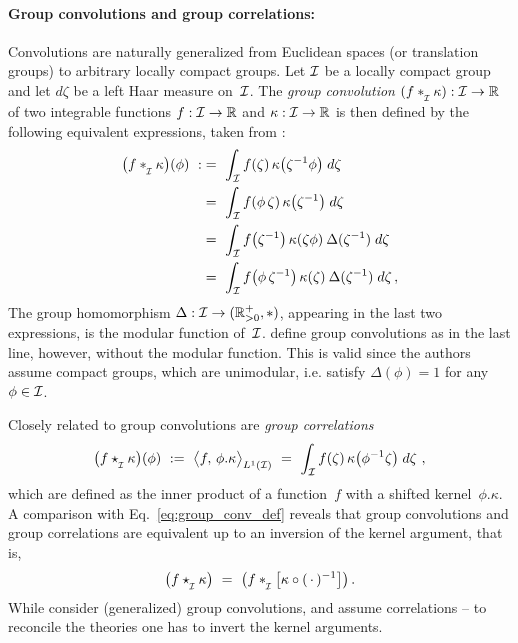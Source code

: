 \paragraph{Group convolutions and group correlations:}
Convolutions are naturally generalized from Euclidean spaces (or translation groups) to arbitrary locally compact groups.
Let $\mathcal{I}$ be a locally compact group and let $d\zeta$ be a left Haar measure on~$\mathcal{I}$.
The \emph{group convolution} $(f \ast_{\overset{}{\protect\scalebox{.64}{$\mkern-.5mu \I$}}} \kappa): \I \to \R$ of two integrable functions $f:\mathcal{I}\to\mathbb{R}$ and $\kappa:\mathcal{I}\to\mathbb{R}$ is then defined by the following equivalent expressions, taken from \cite{gallier2019harmonicRepr}:
\begin{align}\label{eq:group_conv_def}
    \big(f \ast_{\overset{}{\protect\scalebox{.64}{$\mkern-.5mu \I$}}} \kappa \big)(\phi)
    \ :&=\ \int_{\I} f(\zeta)\, \kappa\big( \zeta^{-1} \phi \big) \; d\zeta \notag \\
    \ &=\ \int_{\I} f(\phi\, \zeta)\, \kappa\big( \zeta^{-1}\big) \; d\zeta \notag \\
    \ &=\ \int_{\I} f\big(\zeta^{-1} \big)\, \kappa( \zeta\phi)\: \Delta(\zeta^{-1}) \; d\zeta \notag \\
    \ &=\ \int_{\I} f\big(\phi\, \zeta^{-1} \big)\, \kappa( \zeta)\: \Delta(\zeta^{-1}) \; d\zeta \,,
\end{align}
The group homomorphism $\Delta: \mathcal{I} \to (\mathbb{R}^+_{>0},*)$, appearing in the last two expressions, is the modular function of~$\mathcal{I}$.
\citet{Kondor2018-GENERAL} define group convolutions as in the last line, however, without the modular function.
This is valid since the authors assume compact groups, which are unimodular, i.e. satisfy $\Delta(\phi) = 1$ for any $\phi \in\mathcal{I}$.


Closely related to group convolutions are \emph{group correlations}
\begin{align}\label{eq:group_corr_def}
    \big(f \star_{\overset{}{\protect\scalebox{.64}{$\mkern-.5mu \I$}}} \kappa \big)(\phi)
    \ :=\ \big\langle f,\, \phi.\kappa \big\rangle_{L^1(\I)}
    \ =\ \int_{\I} f(\zeta)\, \kappa\big( \phi^{-1} \zeta \big) \; d\zeta\ ,
\end{align}
which are defined as the inner product of a function~$f$ with a shifted kernel~$\phi.\kappa$.
A comparison with Eq.~\eqref{eq:group_conv_def} reveals that group convolutions and group correlations are equivalent up to an inversion of the kernel argument, that is,
\begin{align}\label{eq:group_conv_corr_kernel_inversion}
    \big(f \star_{\overset{}{\protect\scalebox{.64}{$\mkern-.5mu \I$}}} \kappa \big)
    \ =\ \big(f \ast_{\overset{}{\protect\scalebox{.64}{$\mkern-.5mu \I$}}} \big[\kappa \circ (\,\cdot\,)^{-1} \big] \big) \,.
\end{align}
While \citet{Kondor2018-GENERAL} consider (generalized) group convolutions, \citet{bekkers2020bspline} and \citet{Cohen2019-generaltheory} assume correlations -- to reconcile the theories one has to invert the kernel arguments.


